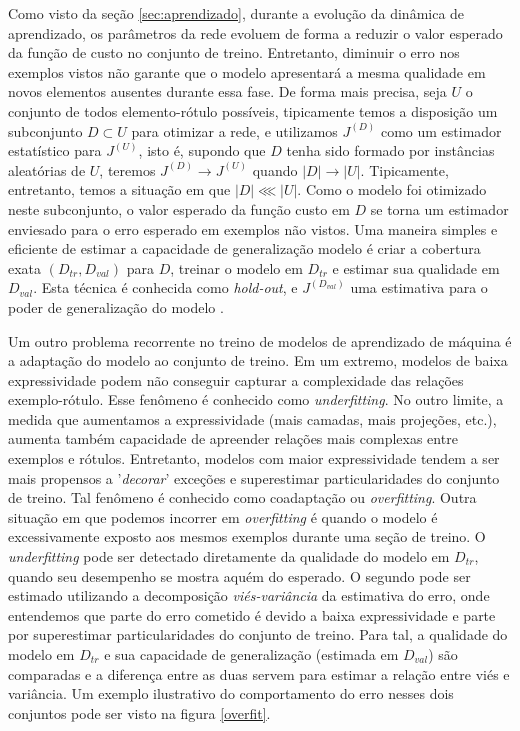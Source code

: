 Como visto da seção \ref{sec:aprendizado}, durante a evolução da dinâmica de aprendizado, os parâmetros da rede evoluem de forma a reduzir o valor esperado da função de custo no conjunto de treino. Entretanto, diminuir o erro nos exemplos vistos não garante que o modelo apresentará a mesma qualidade em novos elementos ausentes durante essa fase. De forma mais precisa, seja $U$ o conjunto de todos elemento-rótulo possíveis, tipicamente temos a disposição um subconjunto $D \subset U$ para otimizar a rede, e utilizamos $J^{(D)}$ como um estimador estatístico para $J^{(U)}$, isto é, supondo que $D$ tenha sido formado por instâncias aleatórias de $U$, teremos $J^{(D)} \rightarrow J^{(U)}$ quando $|D| \rightarrow |U|$. Tipicamente, entretanto, temos a situação em que $|D| \lll |U|$. Como o modelo foi otimizado neste subconjunto, o valor esperado da função custo em $D$ se torna um estimador enviesado para o erro esperado em exemplos não vistos. Uma maneira simples e eficiente de estimar a capacidade de generalização modelo é criar a cobertura exata $(D_{tr}, D_{val})$ para $D$, treinar o modelo em $D_{tr}$ e estimar sua qualidade em $D_{val}$. Esta técnica é conhecida como \textit{hold-out}, e $J^{(D_{val})}$ uma estimativa para o poder de generalização do modelo \cite{friedman2001elements}.

Um outro problema recorrente no treino de modelos de aprendizado de máquina é a adaptação do modelo ao conjunto de treino. Em um extremo, modelos de baixa expressividade podem não conseguir capturar a complexidade das relações exemplo-rótulo. Esse fenômeno é conhecido como \textit{underfitting}. No outro limite, a medida que aumentamos a expressividade (mais camadas, mais projeções, etc.), aumenta também capacidade de apreender relações mais complexas entre exemplos e rótulos. Entretanto, modelos com maior expressividade tendem a ser mais propensos a '\textit{decorar}' exceções e superestimar particularidades do conjunto de treino. Tal fenômeno é conhecido como coadaptação ou \textit{overfitting}. Outra situação em que podemos incorrer em \textit{overfitting} é quando o modelo é excessivamente exposto aos mesmos exemplos durante uma seção de treino. O \textit{underfitting} pode ser detectado diretamente da qualidade do modelo em $D_{tr}$, quando seu desempenho se mostra aquém do esperado. O segundo pode ser estimado utilizando a decomposição \textit{viés-variância} da estimativa do erro, onde entendemos que parte do erro cometido é devido a baixa expressividade e parte por superestimar particularidades do conjunto de treino. Para tal, a qualidade do modelo em $D_{tr}$ e sua capacidade de generalização (estimada em $D_{val}$) são comparadas e a diferença entre as duas servem para estimar a relação entre viés e variância. Um exemplo ilustrativo do comportamento do erro nesses dois conjuntos pode ser visto na figura \ref{overfit}.

